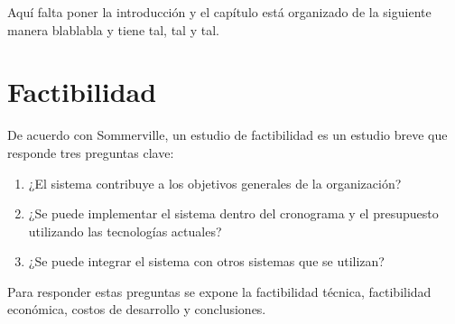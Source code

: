 





Aquí falta poner la introducción y el capítulo está organizado de la siguiente manera blablabla y tiene tal, tal y tal.


\section{Factibilidad}

De acuerdo con Sommerville\cite{sommerville_software_2011}, un estudio de factibilidad es un estudio breve que responde tres preguntas clave:

\begin{enumerate}
    \item ¿El sistema contribuye a los objetivos generales de la organización? 
    \item ¿Se puede implementar el sistema dentro del cronograma y el presupuesto utilizando las tecnologías actuales? 
    \item ¿Se puede integrar el sistema con otros sistemas que se utilizan? 
\end{enumerate}


Para responder estas preguntas se expone la factibilidad técnica, factibilidad económica, costos de desarrollo y conclusiones.






